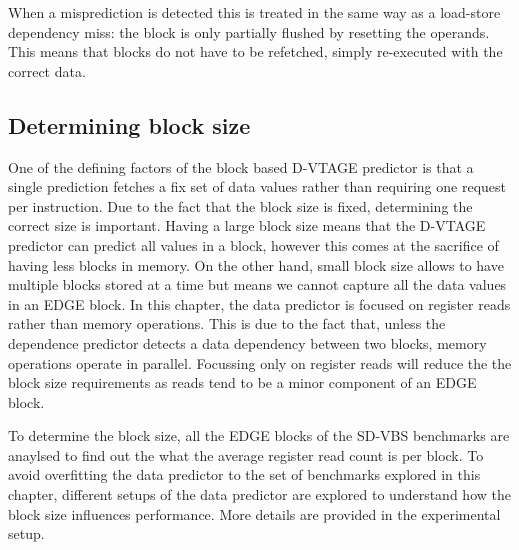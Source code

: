 When a misprediction is detected this is treated in the same way as a load-store dependency miss: the block is only partially flushed by resetting the operands.
This means that blocks do not have to be refetched, simply re-executed with the correct data.

\subsection{Determining block size}

One of the defining factors of the block based D-VTAGE predictor is that a single prediction fetches a fix set of data values rather than requiring one request per instruction.
Due to the fact that the block size is fixed, determining the correct size is important.
Having a large block size means that the D-VTAGE predictor can predict all values in a block, however this comes at the sacrifice of having less blocks in memory.
On the other hand, small block size allows to have multiple blocks stored at a time but means we cannot capture all the data values in an EDGE block.
In this chapter, the data predictor is focused on register reads rather than memory operations.
This is due to the fact that, unless the dependence predictor detects a data dependency between two blocks, memory operations operate in parallel.
Focussing only on register reads will reduce the the block size requirements as reads tend to be a minor component of an EDGE block.

To determine the block size, all the EDGE blocks of the SD-VBS benchmarks are anaylsed to find out the what the average register read count is per block.
To avoid overfitting the data predictor to the set of benchmarks explored in this chapter, different setups of the data predictor are explored to understand how the block size influences performance.
More details are provided in the experimental setup.
